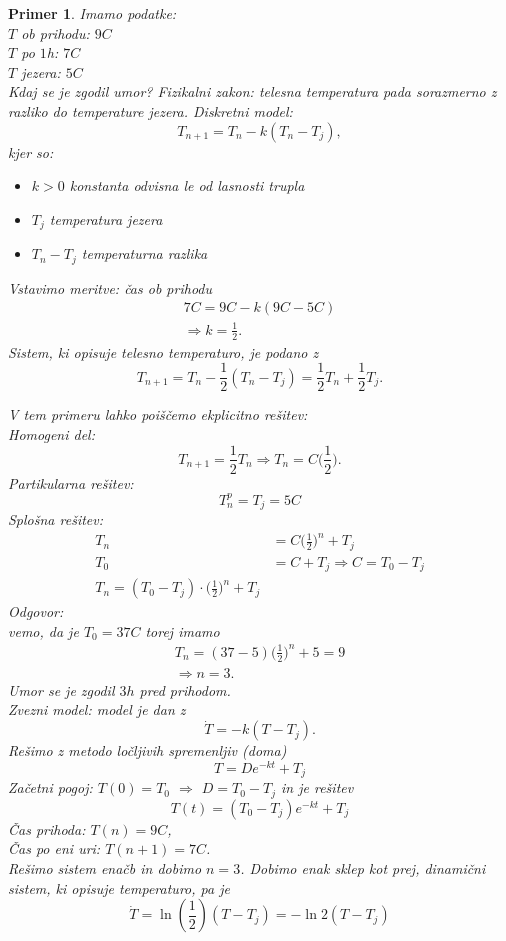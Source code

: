 \documentclass{article}
\newtheorem{primer}{Primer}
\begin{document}
\begin{primer}
Imamo podatke:\\ 
$T$ ob prihodu: $9C$\\ 
$T$ po $1$h: $7C$\\ 
$T$ jezera: $5C$\\ 
Kdaj se je zgodil umor? Fizikalni zakon: telesna temperatura pada sorazmerno z razliko do temperature jezera. Diskretni model:
$$
T_{n+1} = T_n - k(T_n - T_j),
$$
kjer so:
\begin{itemize}
\item $k>0$ konstanta odvisna le od lasnosti trupla
\item $T_j$ temperatura jezera
\item $T_n - T_j$ temperaturna razlika
\end{itemize}
Vstavimo meritve: čas ob prihodu
\begin{align*}
7C = 9C - k(9C - 5C) \\ 
\Longrightarrow k = \frac{1}{2}.
\end{align*}
Sistem, ki opisuje telesno temperaturo, je podano z 
$$
T_{n+1} = T_n - \frac{1}{2}(T_n - T_j) = \frac{1}{2}T_n + \frac{1}{2} T_j.
$$

V tem primeru lahko poiščemo ekplicitno rešitev:\\ 
Homogeni del:
$$
T_{n+1} = \frac{1}{2} T_n \Longrightarrow T_n = C\Big(\frac{1}{2}\Big).
$$
Partikularna rešitev:
$$
T_n^p = T_j = 5C
$$
Splošna rešitev:
\begin{align*}
T_n &= C\Big(\frac{1}{2}\Big)^n + T_j \\ 
T_0 &= C + T_j \Longrightarrow C = T_0 - T_j\\ 
T_n = (T_0 - T_j)\cdot\Big(\frac{1}{2}\Big)^n + T_j
\end{align*}
Odgovor:\\ 
vemo, da je $T_0 = 37C$ torej imamo
\begin{align*}
T_n = (37 - 5) \Big(\frac{1}{2}\Big)^n  + 5 = 9 \\ 
\Longrightarrow n = 3.
\end{align*}
Umor se je zgodil $3h$ pred prihodom.\\ 
Zvezni model:
model je dan z
$$
\dot{T} = - k(T - T_j).
$$
Rešimo z metodo ločljivih spremenljiv (doma)
$$
T = D e^{-kt} + T_j
$$
Začetni pogoj: $T(0) = T_0$ $\Longrightarrow$ $D = T_0 - T_j$ in je rešitev
$$
T(t) = (T_0 - T_j)e^{-kt} + T_j
$$
Čas prihoda: $T(n) = 9C$, \\ 
Čas po eni uri: $T(n+1) = 7C$.\\ 
Rešimo sistem enačb in dobimo $n = 3$. Dobimo enak sklep kot prej, dinamični sistem, ki opisuje temperaturo, pa je
$$
\dot{T} = \ln(\frac{1}{2})(T - T_j) = -\ln{2}(T-T_j)
$$
\end{primer}
\end{document}
